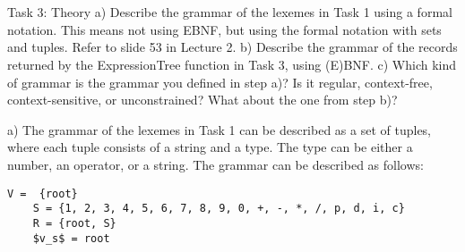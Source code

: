 \documentclass[11pt,a4paper]{report}
\begin{document}
\clearpage

\section{}
Task 3: Theory
a) Describe the grammar of the lexemes in Task 1 using a formal notation. This means not using EBNF,
but using the formal notation with sets and tuples. Refer to slide 53 in Lecture 2.
b) Describe the grammar of the records returned by the ExpressionTree function in Task 3, using (E)BNF.
c) Which kind of grammar is the grammar you defined in step a)? Is it regular, context-free, context-sensitive,
or unconstrained? What about the one from step b)?


a) The grammar of the lexemes in Task 1 can be described as a set of tuples, where each tuple consists of a string and a type. The type can be either a number, an operator, or a string. The grammar can be described as follows:
\begin{lstlisting}[mathescape,escapechar=\%]
    V =  {root}
    S = {1, 2, 3, 4, 5, 6, 7, 8, 9, 0, +, -, *, /, p, d, i, c}
    R = {root, S}
    $v_s$ = root
\end{lstlisting}
\end{document}
